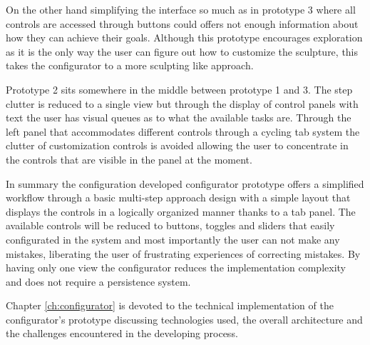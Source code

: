 \documentclass[../medieninformatik-arbeit.tex]{subfiles}
\begin{document}
On the other hand simplifying the interface so much as in prototype 3 where all controls are accessed through buttons could offers not enough information about how they can achieve their goals. Although this prototype encourages exploration as it is the only way the user can figure out how to customize the sculpture, this takes the configurator to a more sculpting like approach. 

Prototype 2 sits somewhere in the middle between prototype 1 and 3. The step clutter is reduced to a single view but through the display of control panels with text the user has visual queues as to what the available tasks are. Through the left panel that accommodates different controls through a cycling tab system the clutter of customization controls is avoided allowing the user to concentrate in the controls that are visible in the panel at the moment. 

In summary the configuration developed configurator prototype offers a simplified workflow through a basic multi-step approach design with a simple layout that displays the controls in a logically organized manner thanks to a tab panel. The available controls will be reduced to buttons, toggles and sliders that easily configurated in the system and most importantly the user can not make any mistakes, liberating the user of frustrating experiences of correcting mistakes. By having only one view the configurator reduces the implementation complexity and does not require a persistence system.

Chapter \ref{ch:configurator} is devoted to the technical implementation of the configurator's prototype discussing technologies used, the overall architecture and the challenges encountered in the developing process. 
\end{document}
